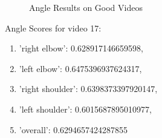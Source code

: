 \begin{figure}[ht] 
   \quad 
    \caption{Angle Results on Good Videos} 
    \centering
    \label{fig:angles_good}
  \end{figure}

  Angle Scores for video 17: 
  \begin{enumerate}
      \item 'right elbow': 0.628917146659598, 
      \item 'left elbow': 0.6475396937624317, 
      \item 'right shoulder': 0.6398373397920147, 
      \item 'left shoulder': 0.6015687895010977, 
      \item 'overall': 0.6294657424287855
  \end{enumerate}

